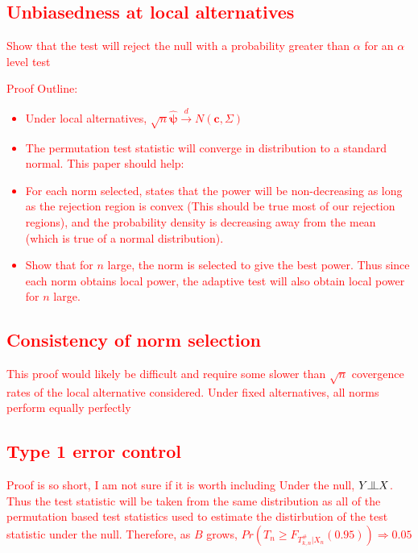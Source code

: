 \documentclass{article}
\newcommand{\sh}{\textcolor{red}}
\newcommand{\indep}{\raisebox{0.05em}{\rotatebox[origin=c]{90}{$\models$}}}
\newcommand{\rvo}{X}
\begin{document}
\sh{\subsection{Unbiasedness at local alternatives}
Show that the test will reject the null with a probability greater than $\alpha$ for an $\alpha$ level test }
\sh{Proof Outline: \\
\begin{itemize}
	\item Under local alternatives, $\sqrt{n}\hat{\boldsymbol{\psi}} \xrightarrow{d} N(\boldsymbol{c}, \Sigma)$
	\item The permutation test statistic will converge in distribution to a standard normal.  This paper should help: \citep{omelka_testing_2012}
	\item For each norm selected, \citep{gupta_inequalitites_1972} states that the power will be non-decreasing as long as the rejection region is convex (This should be true most of our rejection regions), and the probability density is decreasing away from the mean (which is true of a normal distribution).  
	\item Show that for $n$ large, the norm is selected to give the best power.  Thus since each norm obtains local power, the adaptive test will also obtain local power for $n$ large.
\end{itemize}} 

\sh{\subsection{Consistency of norm selection} 
This proof would likely be difficult and require some slower than $\sqrt{n}$ covergence rates of the local alternative considered.  Under fixed alternatives, all norms perform equally perfectly}

\sh{\subsection{Type 1 error control}
Proof is so short, I am not sure if it is worth including
Under the null, $Y \indep \rvo$.  Thus the test statistic will be taken from the same distribution as all of the permutation based test statistics used to estimate the distirbution of the test statistic under the null.  Therefore, as $B$ grows, $Pr(T_n \geq F_{T^\#_{k,n}|\rvo_n}(0.95)) \Rightarrow 0.05$
}

\end{document}
